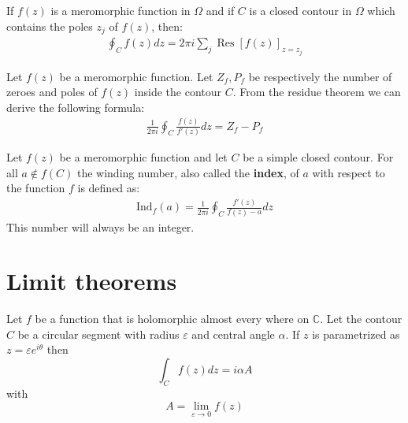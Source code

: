 	\begin{theorem}\label{complexcalculus:residue_theorem}
		If $f(z)$ is a meromorphic function in $\Omega$ and if $C$ is a closed contour in $\Omega$ which contains the poles $z_j$ of $f(z)$, then:
		\begin{gather}
                	\boxed{\oint_Cf(z)dz = 2\pi i\sum_j \operatorname{Res}\left[f(z)\right]_{z=z_j}}
		\end{gather}
	\end{theorem}
    
	\begin{formula}
		Let $f(z)$ be a meromorphic function. Let $Z_f, P_f$ be respectively the number of zeroes and poles of $f(z)$ inside the contour $C$. From the residue theorem we can derive the following formula:
		\begin{gather}
			\frac{1}{2\pi i}\oint_C\frac{f(z)}{f'(z)}dz = Z_f - P_f
		\end{gather}
	\end{formula}
	\begin{formula}
		Let $f(z)$ be a meromorphic function and let $C$ be a simple closed contour. For all $a\not\in f(C)$ the winding number, also called the \textbf{index}, of $a$ with respect to the function $f$ is defined as:
		\begin{gather}
			\text{Ind}_f(a) = \frac{1}{2\pi i}\oint_C\frac{f'(z)}{f(z) - a}dz
		\end{gather}
		This number will always be an integer.
	\end{formula}

\section{Limit theorems}

    	\begin{theorem}\label{complexcalculus:theorem:small_limit}
		Let $f$ be a function that is holomorphic almost every where on $\mathbb{C}$. Let the contour $C$ be a circular segment with radius $\varepsilon$ and central angle $\alpha$.
		If $z$ is parametrized as $z = \varepsilon e^{i\theta}$ then\[\int_Cf(z)dz = i\alpha A\] with \[A = \lim_{\varepsilon\rightarrow0}f(z)\]
	\end{theorem}
	
